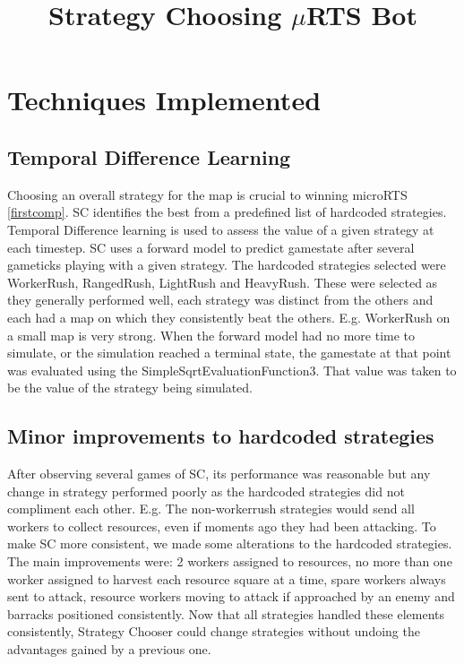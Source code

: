 \documentclass[]{article}
\title{Strategy Choosing $\mu$RTS Bot}
\author{}
\begin{document}
\maketitle

\begin{abstract}

\end{abstract}

\section{Techniques Implemented}


\subsection{Temporal Difference Learning}
Choosing an overall strategy for the map is crucial to winning microRTS \ref{firstcomp}. SC identifies the best from a predefined list of hardcoded strategies. Temporal Difference learning is used to assess the value of a given strategy at each timestep. SC uses a forward model to predict gamestate after several gameticks playing with a given strategy. The hardcoded strategies selected were WorkerRush, RangedRush, LightRush and HeavyRush. These were selected as they generally performed well, each strategy was distinct from the others and each had a map on which they consistently beat the others. E.g. WorkerRush on a small map is very strong. When the forward model had no more time to simulate, or the simulation reached a terminal state, the gamestate at that point was evaluated using the SimpleSqrtEvaluationFunction3. That value was taken to be the value of the strategy being simulated.

\subsection{Minor improvements to hardcoded strategies}
After observing several games of SC, its performance was reasonable but any change in strategy performed poorly as the hardcoded strategies did not compliment each other. E.g. The non-workerrush strategies would send all workers to collect resources, even if moments ago they had been attacking. To make SC more consistent, we made some alterations to the hardcoded strategies. The main improvements were: 2 workers assigned to resources, no more than one worker assigned to harvest each resource square at a time, spare workers always sent to attack, resource workers moving to attack if approached by an enemy and barracks positioned consistently. Now that all strategies handled these elements consistently, Strategy Chooser could change strategies without undoing the advantages gained by a previous one. 
\end{document}

